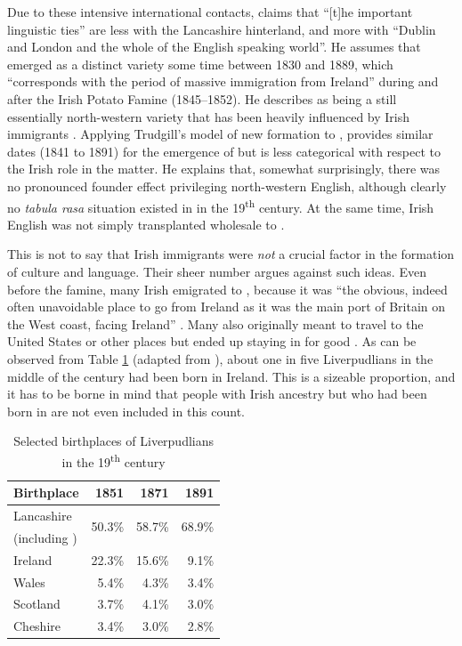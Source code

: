 Due to these intensive international contacts, \citet[15]{knowles1973} claims that ``[t]he important linguistic ties'' are less with the Lancashire hinterland, and more with ``Dublin and London and the whole of the English speaking world''.
He assumes that  emerged as a distinct variety some time between 1830 and 1889, which ``corresponds with the period of massive immigration from Ireland'' \parencite[18]{knowles1973} during and after the Irish Potato Famine (1845--1852).
He describes  as being a still essentially north-western variety that has been heavily influenced by Irish immigrants \parencite[cf.][51]{knowles1973}.
Applying Trudgill's model of new  formation \citep{trudgill1986,trudgill2004} to , \textcite{honeybone2007} provides similar dates (1841 to 1891) for the emergence of  but is less categorical with respect to the Irish role in the matter.
He explains that, somewhat surprisingly, there was no pronounced founder effect privileging north-western English, although clearly no \emph{tabula rasa} situation existed in  in the 19\textsuperscript{th} century.
At the same time, Irish English was not simply transplanted wholesale to  \citep[cf.][117 and 121]{honeybone2007}.

This is not to say that Irish immigrants were \emph{not} a crucial factor in the formation of  culture and language.
Their sheer number argues against such ideas.
Even before the famine, many Irish emigrated to , because it was ``the obvious, indeed often unavoidable place to go from Ireland as it was the main port of Britain on the West coast, facing Ireland'' \parencite[114]{honeybone2007}.
Many also originally meant to travel to the United States or other places but ended up staying in  for good  \citep[cf.][117]{honeybone2007}.
As can be observed from Table \ref{tab.birthplace} (adapted from \cite[249]{pooley2006}), about one in five Liverpudlians in the middle of the century had been born in Ireland.
This is a sizeable proportion, and it has to be borne in mind that people with Irish ancestry but who had been born in  are not even included in this count.

	\begin{table}[h]
		\centering
		\caption{Selected birthplaces of Liverpudlians in the 19\textsuperscript{th} century}
		\begin{tabular}{lrrr}
			\hline
			Birthplace & 1851 & 1871 & 1891 \\ 
			\hline
			Lancashire & \multirow{2}{*}{50.3\%} & \multirow{2}{*}{58.7\%} & \multirow{2}{*}{68.9\%} \\
			(including \isi{Liverpool}) & & & \\
			Ireland & 22.3\% & 15.6\% & 9.1\% \\ 
			Wales & 5.4\% & 4.3\% & 3.4\% \\ 
			Scotland & 3.7\% & 4.1\% & 3.0\% \\
			Cheshire & 3.4\% & 3.0\% & 2.8\% \\ 
			\hline
		\end{tabular}
		\label{tab.birthplace}
	\end{table}

